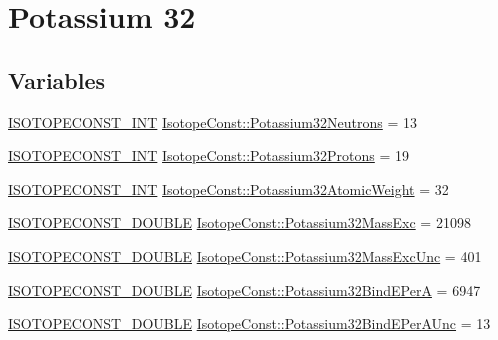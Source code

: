 \hypertarget{group___isotope_const-_potassium-_k32}{}\section{Potassium 32}
\label{group___isotope_const-_potassium-_k32}
\subsection*{Variables}
\begin{DoxyCompactItemize}
\item 
\mbox{\hyperlink{group___isotope_const-_macros_ga5f18360b3e99483a35c32d789e62621c}{I\+S\+O\+T\+O\+P\+E\+C\+O\+N\+S\+T\+\_\+\+I\+NT}} \mbox{\hyperlink{group___isotope_const-_potassium-_k32_ga02ed4f197ee7f0475993310bfebe6afa}{Isotope\+Const\+::\+Potassium32\+Neutrons}} = 13
\item 
\mbox{\hyperlink{group___isotope_const-_macros_ga5f18360b3e99483a35c32d789e62621c}{I\+S\+O\+T\+O\+P\+E\+C\+O\+N\+S\+T\+\_\+\+I\+NT}} \mbox{\hyperlink{group___isotope_const-_potassium-_k32_gafb2b97e75c02234c8f8ba079a03d17f4}{Isotope\+Const\+::\+Potassium32\+Protons}} = 19
\item 
\mbox{\hyperlink{group___isotope_const-_macros_ga5f18360b3e99483a35c32d789e62621c}{I\+S\+O\+T\+O\+P\+E\+C\+O\+N\+S\+T\+\_\+\+I\+NT}} \mbox{\hyperlink{group___isotope_const-_potassium-_k32_ga69a585aa666d6c71f9fe7eac17d3f2c4}{Isotope\+Const\+::\+Potassium32\+Atomic\+Weight}} = 32
\item 
\mbox{\hyperlink{group___isotope_const-_macros_ga8f45a7272ce02c0b4c65c44636ed719a}{I\+S\+O\+T\+O\+P\+E\+C\+O\+N\+S\+T\+\_\+\+D\+O\+U\+B\+LE}} \mbox{\hyperlink{group___isotope_const-_potassium-_k32_ga44f2b0654a5b6e2f0b947937051dd740}{Isotope\+Const\+::\+Potassium32\+Mass\+Exc}} = 21098
\item 
\mbox{\hyperlink{group___isotope_const-_macros_ga8f45a7272ce02c0b4c65c44636ed719a}{I\+S\+O\+T\+O\+P\+E\+C\+O\+N\+S\+T\+\_\+\+D\+O\+U\+B\+LE}} \mbox{\hyperlink{group___isotope_const-_potassium-_k32_ga588ff171ec502ca3435a0af4a3e657d5}{Isotope\+Const\+::\+Potassium32\+Mass\+Exc\+Unc}} = 401
\item 
\mbox{\hyperlink{group___isotope_const-_macros_ga8f45a7272ce02c0b4c65c44636ed719a}{I\+S\+O\+T\+O\+P\+E\+C\+O\+N\+S\+T\+\_\+\+D\+O\+U\+B\+LE}} \mbox{\hyperlink{group___isotope_const-_potassium-_k32_ga38236b201c56fa651d0a1ce3a4c424d1}{Isotope\+Const\+::\+Potassium32\+Bind\+E\+PerA}} = 6947
\item 
\mbox{\hyperlink{group___isotope_const-_macros_ga8f45a7272ce02c0b4c65c44636ed719a}{I\+S\+O\+T\+O\+P\+E\+C\+O\+N\+S\+T\+\_\+\+D\+O\+U\+B\+LE}} \mbox{\hyperlink{group___isotope_const-_potassium-_k32_gaebf0153c037eafa494a66f60e3c0528e}{Isotope\+Const\+::\+Potassium32\+Bind\+E\+Per\+A\+Unc}} = 13

\end{DoxyCompactItemize}
